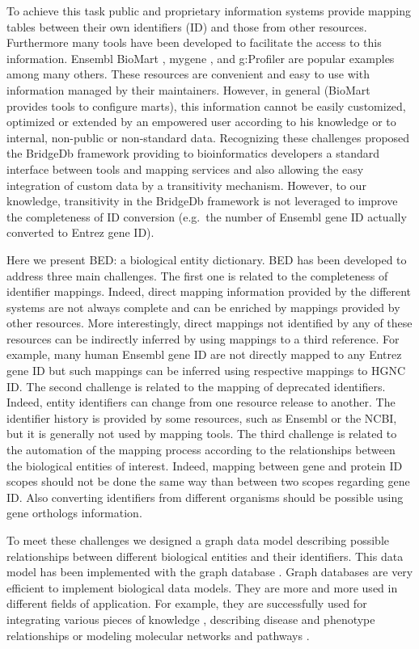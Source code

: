 \documentclass[9pt,a4paper,]{extarticle}
\theoremstyle{definition}
\theoremstyle{definition}
\theoremstyle{definition}
\theoremstyle{remark}
\begin{document}
To achieve this task public and proprietary information systems
provide mapping tables between their own identifiers (ID) and those
from other resources.
Furthermore many tools have been developed to facilitate the access
to this information.
Ensembl BioMart \citep{kinsella_ensembl_2011},
mygene \citep{wu_biogps_2013},
and g:Profiler \citep{reimand_g:profiler-web_2016}
are popular examples among many others.
These resources are convenient and easy to use with information
managed by their maintainers.
However, in general (BioMart provides tools to configure marts),
this information cannot be easily customized, optimized
or extended by an empowered user according to his knowledge or to internal,
non-public or non-standard data.
Recognizing these challenges \citet{van_iersel_bridgedb_2010} proposed
the BridgeDb framework providing to bioinformatics developers
a standard interface between tools and
mapping services and also allowing the easy integration of custom data
by a transitivity mechanism. However, to our knowledge,
transitivity in the BridgeDb framework is not leveraged to improve the
completeness of ID conversion (e.g.~the number of Ensembl
gene ID actually converted to Entrez gene ID).

Here we present BED: a biological entity dictionary.
BED has been developed to address three main challenges.
The first one is related to the completeness of identifier mappings.
Indeed, direct mapping information provided by the different
systems are not always complete and can be enriched by mappings provided
by other resources. More interestingly, direct mappings not identified by
any of these resources can be indirectly inferred by using mappings to a
third reference. For example, many human Ensembl gene ID are not
directly mapped to any Entrez gene ID but such mappings can be inferred
using respective mappings to HGNC ID.
The second challenge is related to the mapping of deprecated identifiers.
Indeed, entity identifiers can change from one resource release to another.
The identifier history is provided by some resources, such as Ensembl or
the NCBI, but it is generally not used by mapping tools.
The third challenge is related to the automation of the mapping process
according to the relationships between the biological entities of interest.
Indeed, mapping between gene and protein ID scopes should not be done
the same way than between two scopes regarding gene ID.
Also converting identifiers from different organisms should be possible
using gene orthologs information.

To meet these challenges we designed a graph data model describing possible
relationships between different biological entities and their identifiers.
This data model has been implemented with the \neo{} graph
database \citep{neo4j_inc_neo4j_2017}.
Graph databases are very efficient to implement biological data models.
They are more and more used in different fields of application.
For example, they are successfully used for
integrating various
pieces of knowledge \citep[\citet{yoon_use_2017}]{pareja-tobes_bio4j:_2015},
describing disease and phenotype relationships \citep{pareja-tobes_bio4j:_2015}
or modeling molecular networks
and pathways \citep[\citet{fabregat_reactome_2018-1}]{dai_hrgrn:_2016}.
\end{document}
